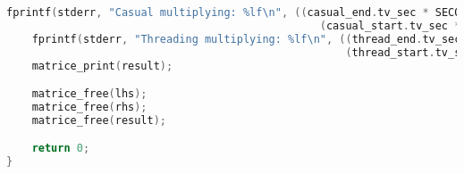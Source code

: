 \begin{lstlisting}[language=C]
    fprintf(stderr, "Casual multiplying: %lf\n", ((casual_end.tv_sec * SECOND2NANO + casual_end.tv_nsec) - 
                                                 (casual_start.tv_sec * SECOND2NANO + casual_start.tv_nsec)) / (double) SECOND2NANO);
    fprintf(stderr, "Threading multiplying: %lf\n", ((thread_end.tv_sec * SECOND2NANO + thread_end.tv_nsec) - 
                                                     (thread_start.tv_sec * SECOND2NANO + thread_start.tv_nsec)) / (double) SECOND2NANO);
    matrice_print(result);

    matrice_free(lhs);
    matrice_free(rhs);
    matrice_free(result);

    return 0;
}

\end{lstlisting}

\pagebreak